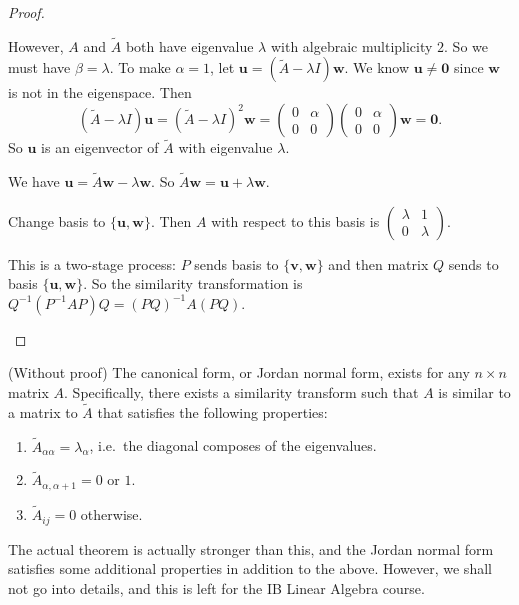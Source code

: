 \documentclass[a4paper]{article}
\begin{document}
\begin{proof}
\begin{enumerate}
      However, $A$ and $\tilde{A}$ both have eigenvalue $\lambda$ with algebraic multiplicity $2$. So we must have $\beta = \lambda$. To make $\alpha = 1$, let $\mathbf{u} = (\tilde{A} - \lambda I)\mathbf{w}$. We know $\mathbf{u}\not= \mathbf{0}$ since $\mathbf{w}$ is not in the eigenspace. Then
      \[
        (\tilde{A} - \lambda I)\mathbf{u} = (\tilde{A} - \lambda I)^2 \mathbf{w} =
        \begin{pmatrix}
          0 & \alpha\\
          0 & 0
        \end{pmatrix}
        \begin{pmatrix}
          0 & \alpha\\
          0 & 0
        \end{pmatrix}\mathbf{w} = \mathbf{0}.
      \]
      So $\mathbf{u}$ is an eigenvector of $\tilde{A}$ with eigenvalue $\lambda$.

      We have $\mathbf{u} = \tilde A\mathbf{w} - \lambda\mathbf{w}$. So $\tilde A\mathbf{w} = \mathbf{u} + \lambda\mathbf{w}$.

      Change basis to $\{\mathbf{u}, \mathbf{w}\}$. Then $A$ with respect to this basis is $
      \begin{pmatrix}
        \lambda & 1\\
        0 & \lambda
      \end{pmatrix}$.

      This is a two-stage process: $P$ sends basis to $\{\mathbf{v}, \mathbf{w}\}$ and then matrix $Q$ sends to basis $\{\mathbf{u}, \mathbf{w}\}$. So the similarity transformation is $Q^{-1}(P^{-1}AP)Q = (PQ)^{-1}A(PQ)$.\qedhere
  \end{enumerate}
\end{proof}

\begin{prop}
  (Without proof) The canonical form, or Jordan normal form, exists for any $n\times n$ matrix $A$. Specifically, there exists a similarity transform such that $A$ is similar to a matrix to $\tilde{A}$ that satisfies the following properties:
  \begin{enumerate}
    \item $\tilde{A}_{\alpha\alpha} = \lambda_\alpha$, i.e.\ the diagonal composes of the eigenvalues.
    \item $\tilde{A}_{\alpha, \alpha + 1} = 0$ or $1$.
    \item $\tilde{A}_{ij} = 0$ otherwise.
  \end{enumerate}
\end{prop}
The actual theorem is actually stronger than this, and the Jordan normal form satisfies some additional properties in addition to the above. However, we shall not go into details, and this is left for the IB Linear Algebra course.
\end{document}

